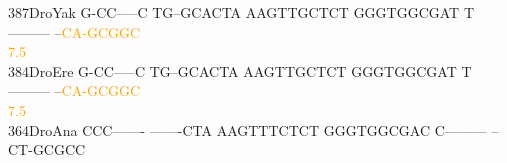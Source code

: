 \documentclass[11pt,twoside,reqno,a4paper]{article}
\begin{document}
{387\hspace*{1\charwidth}DroYak	G-CC-----C	TG--GCACTA	AAGTTGCTCT	GGGTGGCGAT	T---------	--\textcolor{orange}{C}\textcolor{orange}{A}\textcolor{orange}{-}\textcolor{orange}{G}\textcolor{orange}{C}\textcolor{orange}{G}\textcolor{orange}{G}\textcolor{orange}{C}	\\
\hspace*{4\charwidth}\hspace*{7\charwidth}\hspace*{1\charwidth}\hspace*{1\charwidth}\hspace*{1\charwidth}\hspace*{1\charwidth}\hspace*{1\charwidth}\hspace*{52\charwidth}\textcolor{orange}{7.5}\hspace*{1\charwidth}\\
384\hspace*{1\charwidth}DroEre	G-CC-----C	TG--GCACTA	AAGTTGCTCT	GGGTGGCGAT	T---------	--\textcolor{orange}{C}\textcolor{orange}{A}\textcolor{orange}{-}\textcolor{orange}{G}\textcolor{orange}{C}\textcolor{orange}{G}\textcolor{orange}{G}\textcolor{orange}{C}	\\
\hspace*{4\charwidth}\hspace*{7\charwidth}\hspace*{1\charwidth}\hspace*{1\charwidth}\hspace*{1\charwidth}\hspace*{1\charwidth}\hspace*{1\charwidth}\hspace*{52\charwidth}\textcolor{orange}{7.5}\hspace*{1\charwidth}\\
364\hspace*{1\charwidth}DroAna	CCC-------	-------CTA	AAGTTTCTCT	GGGTGGCGAC	C---------	--CT-GCGCC	\\
\hspace*{4\charwidth}\hspace*{7\charwidth}\hspace*{1\charwidth}\hspace*{1\charwidth}\hspace*{1\charwidth}\hspace*{1\charwidth}\hspace*{1\charwidth}\hspace*{1\charwidth}\\
}
\end{document}
